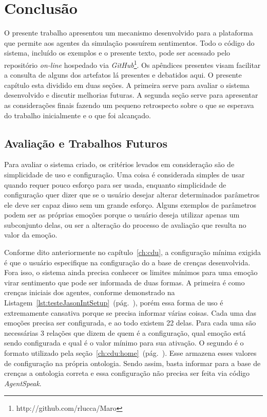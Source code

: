 \chapter{Conclusão} \label{ch:cf}

O presente trabalho apresentou um mecanismo desenvolvido para a plataforma
\jason que permite aos agentes da simulação possuírem sentimentos. Todo o
código do sistema, incluído os exemplos e o presente texto, pode ser acessado
pelo repositório \emph{on-line} hospedado via
\emph{GitHub}\footnote{http://github.com/rlucca/Maro}.
Os apêndices presentes visam facilitar a consulta de alguns dos artefatos lá
presentes e debatidos aqui.
O presente capítulo esta dividido em duas seções. A primeira serve para
avaliar o sistema desenvolvido e discutir melhorias futuras. A segunda seção
serve para apresentar as considerações finais fazendo um pequeno retrospecto
sobre o que se esperava do trabalho inicialmente e o que foi alcançado.


\section{Avaliação e Trabalhos Futuros}

Para avaliar o sistema criado, os critérios levados em consideração são de
simplicidade de uso e configuração. Uma coisa é considerada simples de usar
quando requer pouco esforço para ser usada, enquanto simplicidade de
configuração quer dizer que se o usuário desejar alterar determinados
parâmetros ele deve ser capaz disso sem um grande esforço. Alguns exemplos de
parâmetros podem ser as próprias emoções porque o usuário deseja utilizar
apenas um subconjunto delas, ou ser a alteração do processo de avaliação que
resulta no valor da emoção.

Conforme dito anteriormente no capítulo~\ref{ch:cdu}, a configuração mínima
exigida é que o usuário especifique na configuração do \jason a base de
crenças desenvolvida. Fora isso, o sistema ainda precisa conhecer os limites
mínimos para uma emoção virar sentimento que pode ser informada de duas
formas. A primeira é como crenças iniciais dos agentes, conforme demonstrado na
Listagem~\ref{lst:testeJasonIntSetup}~(pág.~\pageref{lst:testeJasonIntSetup}),
porém essa forma de uso é extremamente cansativa porque se precisa informar
várias coisas. Cada uma das emoções precisa ser configurada, e ao todo existem
22 delas. Para cada uma são necessárias 3 relações que dizem de quem é a
configuração, qual emoção está sendo configurada e qual é o valor mínimo
para sua ativação. O segundo é o formato utilizado pela
seção~\ref{ch:cdu:home}~(pág.~\pageref{ch:cdu:home}). Esse armazena esses
valores de configuração na própria ontologia. Sendo assim, basta informar para
a base de crenças a ontologia correta e essa configuração não precisa ser
feita via código \emph{AgentSpeak}.


